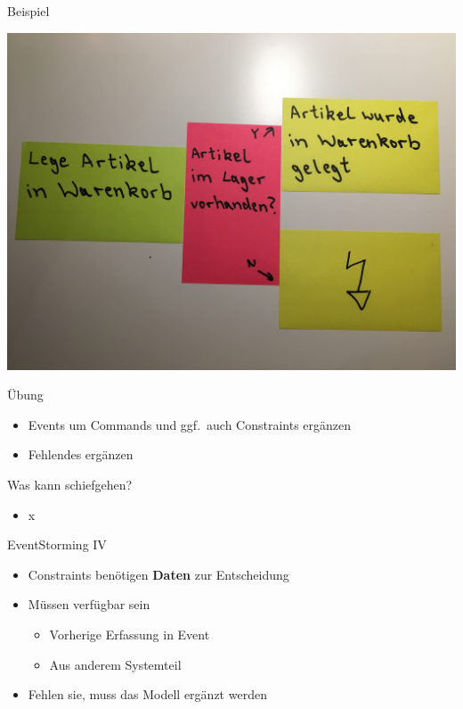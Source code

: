 \begin{frame}[fragile]{Beispiel}

\begin{center}
\includegraphics[width=.85\textwidth]{pics/eventstorming3.jpg}
\end{center}

\end{frame}


\begin{frame}[fragile]{Übung}

\begin{itemize}
\item Events um Commands und ggf.~auch Constraints ergänzen
\item Fehlendes ergänzen
\end{itemize}

\end{frame}

\begin{frame}[fragile]{Was kann schiefgehen?}

\begin{itemize}
\item x
\end{itemize}

\end{frame}


\begin{frame}[fragile]{EventStorming IV}

\begin{itemize}
\item Constraints benötigen \textbf{Daten} zur Entscheidung
\item Müssen verfügbar sein
\begin{itemize}
\item Vorherige Erfassung in Event
\item Aus anderem Systemteil
\end{itemize}
\item Fehlen sie, muss das Modell ergänzt werden
\end{itemize}

\end{frame}


